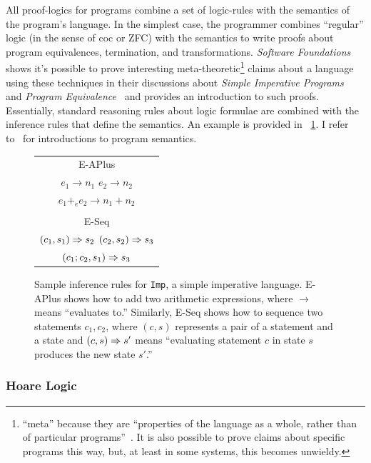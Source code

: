 All proof-logics for programs combine a set of logic-rules with the semantics of
the program's language. In the simplest case, the programmer combines
``regular'' logic (in the sense of \gls{coc} or ZFC) with the semantics to write
proofs about program equivalences, termination, and transformations.
\emph{Software Foundations} shows it's possible to prove interesting
meta-theoretic\footnote{``meta'' because they are ``properties of the language
as a whole, rather than of particular programs''~\cite{Pierce:SF2}. It is also
possible to prove claims about specific programs this way, but, at least in some
systems, this becomes unwieldy.} claims about a language using these techniques
in their discussions about \emph{Simple Imperative Programs}~\cite{Pierce:SF1}
and \emph{Program Equivalence}~\cite{Pierce:SF2} and provides an introduction to
such proofs. Essentially, standard reasoning rules about logic formulae are
combined with the inference rules that define the semantics. An example is
provided in \figurename~\ref{F:Imp_ex}. I refer
to~\cite{Winskel_1993,Harper_2016} for introductions to program semantics.

\begin{figure}
    \centering
    \begin{tabular}{c}
        E-APlus \\
        \(e_1 \to n_1\) \quad \(e_2 \to n_2\) \\
        \midrule
        \(e_1 +_e e_2 \to n_1 + n_2\) \\

        \\

        E-Seq \\
        \((c_1, s_1) \mathrel{\Rightarrow} s_2\) \quad \((c_2, s_2) \mathrel{\Rightarrow} s_3\) \\
        \midrule
        \((c_1;c_2, s_1) \mathrel{\Rightarrow} s_3\)
    \end{tabular}
    \caption{Sample inference rules for \texttt{Imp}, a simple imperative
    language. E-APlus shows how to add two arithmetic expressions, where \(\to\)
    means ``evaluates to.'' Similarly, E-Seq shows how to sequence two
    statements \(c_1, c_2\), where \((c, s)\) represents a pair of a statement
    and a state and \((c, s) \mathrel{\Rightarrow} s'\) means ``evaluating statement \(c\) in
    state \(s\) produces the new state \(s'\).''}\label{F:Imp_ex}
\end{figure}

\subsubsection{Hoare Logic}


